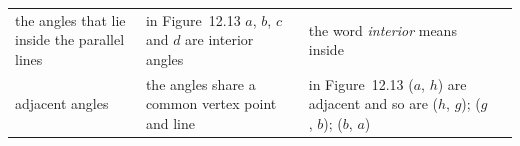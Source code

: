 \begin{center}
\begin{xtabular*}{\mytablewidth}[t]{|p{3cm}|p{3cm}|p{3cm}|p{20\mystarwidth}|}
        the angles that lie inside the parallel lines &
        in Figure~12.13 \begin{math}a\end{math}, \begin{math}b\end{math}, \begin{math}c\end{math} and \begin{math}d\end{math} are interior angles &
        the word \textsl{interior} means inside%
     \tabularnewline{}
        adjacent angles &
        the angles share a common vertex point and line &
        in Figure~12.13 (\begin{math}a\end{math}, \begin{math}h\end{math}) are adjacent and so are (\begin{math}h\end{math}, \begin{math}g\end{math}); (\begin{math}g\end{math}, \begin{math}b\end{math}); (\begin{math}b\end{math}, \begin{math}a\end{math}) &

\end{xtabular*}
\end{center}
